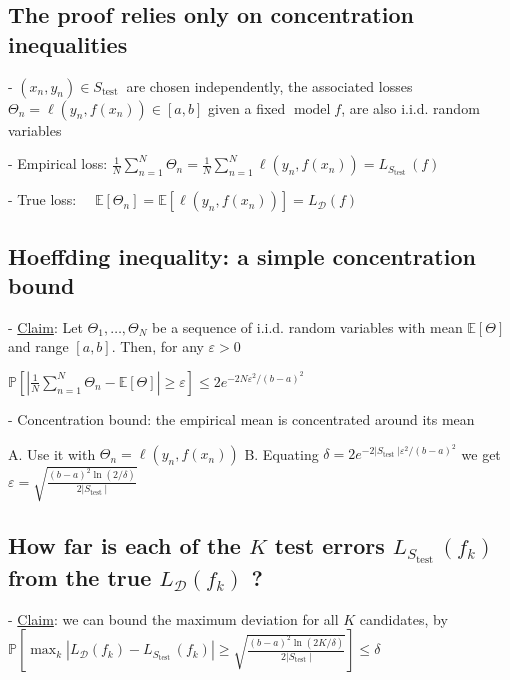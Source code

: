 
\subsection*{The proof relies only on concentration inequalities}
- $(x_{n}, y_{n}) \in S_{\text {test }}$ are chosen independently, the associated losses $\Theta_{n}=\ell(y_{n}, f(x_{n})) \in[a, b]$ given a fixed $\operatorname{model} f$, are also i.i.d. random variables

- Empirical loss: $\frac{1}{N} \sum_{n=1}^{N} \Theta_{n}=\frac{1}{N} \sum_{n=1}^{N} \ell(y_{n}, f(x_{n}))=L_{S_{\text {test }}}(f)$

- True loss: $\quad \mathbb{E}[\Theta_{n}]=\mathbb{E}[\ell(y_{n}, f(x_{n}))]=L_{\mathscr{D}}(f)$


\subsection*{Hoeffding inequality: a simple concentration bound}
- \underline{Claim}: Let $\Theta_{1}, \ldots, \Theta_{N}$ be a sequence of i.i.d. random variables with mean $\mathbb{E}[\Theta]$ and range $[a, b]$. Then, for any $\varepsilon>0$

$
\mathbb{P}[|\frac{1}{N} \sum_{n=1}^{N} \Theta_{n}-\mathbb{E}[\Theta]| \geq \varepsilon] \leq 2 e^{-2 N \varepsilon^{2} /(b-a)^{2}}
$

- Concentration bound: the empirical mean is concentrated around its mean

A. Use it with $\Theta_{n}=\ell(y_{n}, f(x_{n}))$
B. Equating $\delta=2 e^{-2|S_{\text {test }}| \varepsilon^{2} /(b-a)^{2}}$ we get $\varepsilon=\sqrt{\frac{(b-a)^{2} \ln (2 / \delta)}{2|S_{\text {test }}|}}$


\subsection*{How far is each of the $K$ test errors $L_{S_{\text {test }}}(f_{k})$ from the true $L_{\mathscr{D}}(f_{k})$ ?}
- \underline{Claim}: we can bound the maximum deviation for all $K$ candidates, by
$
\mathbb{P}[\max _{k}|L_{\mathscr{D}}(f_{k})-L_{S_{\text {test }}}(f_{k})| \geq \sqrt{\frac{(b-a)^{2} \ln (2 K / \delta)}{2|S_{\text {test }}|}}] \leq \delta
$

